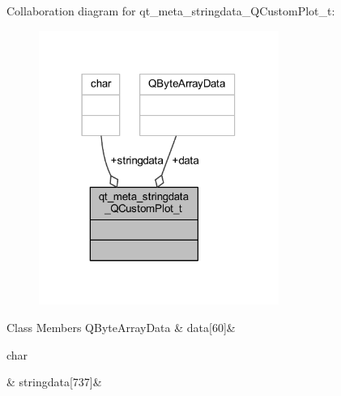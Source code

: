 Collaboration diagram for qt\+\_\+meta\+\_\+stringdata\+\_\+\+Q\+Custom\+Plot\+\_\+t\+:
\nopagebreak
\begin{figure}[H]
\begin{center}
\leavevmode
\includegraphics[width=222pt]{d6/daa/a00187}
\end{center}
\end{figure}
\begin{DoxyFields}{Class Members}
\hypertarget{a00016_a294e0b700c66ea0a3f528f255fa52fff}{Q\+Byte\+Array\+Data}\label{a00016_a294e0b700c66ea0a3f528f255fa52fff}
&
data\mbox{[}60\mbox{]}&
\\
\hline

\hypertarget{a00016_a06c7bf819765fdc7a40739cfb2bb681c}{char}\label{a00016_a06c7bf819765fdc7a40739cfb2bb681c}
&
stringdata\mbox{[}737\mbox{]}&
\\
\hline

\end{DoxyFields}


